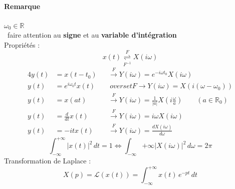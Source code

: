 \paragraph{Remarque} $\omega_0\in\mathbb{R}$\\ \danger\ faire attention au \textbf{signe} et au \textbf{variable d'intégration}\\
Propriétés : 
$$x(t)\overset{F}{\underset{F^{-1}}{\rightleftharpoons}}X(i\omega)$$
\begin{alignat*}{4}
	y(t) & = x(t-t_0)           &   & \overset{F}{\rightarrow} Y(i\omega)=e^{-i\omega t_0}X(i\omega)                                            \\
	y(t) & = e^{i\omega_0t}x(t) &   & \                                                                                                         
	overset{F}{\rightarrow} Y(i\omega)=X(i(\omega-\omega_0))\\ 
	y(t) & = x(at)              &   & \overset{F}{\rightarrow} Y(i\omega)=\frac{1}{|a|}X\left(i\frac{\omega}{a}\right)\qquad (a\in\mathbb{R}_0) \\
	y(t) & = \frac{d}{dt}x(t)   &   & \overset{F}{\rightarrow} Y(i\omega)=i\omega X(i\omega)                                                    \\
	y(t) & = -itx(t)            &   & \overset{F}{\rightarrow} Y(i\omega)=\frac{dX(i\omega)}{d\omega}                                           
\end{alignat*}
$$\int_{-\infty}^{+\infty}|x(t)|^2\,dt=1\Leftrightarrow\int_{-\infty}{+\infty}|X(i\omega)|^2\,d\omega=2\pi $$
Transformation de Laplace : 
$$X(p)=\mathcal{L}(x(t))=\int_{-\infty}^{+\infty}x(t)\,e^{-pt}\,dt $$

